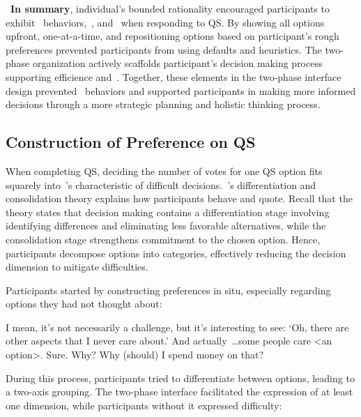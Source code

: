 ~\textbf{In summary}, individual's bounded rationality encouraged participants to exhibit~\underline{} behaviors,~\underline{}, and~\underline{} when responding to QS. By showing all options upfront, one-at-a-time, and repositioning options based on participant's rough preferences prevented participants from using defaults and heuristics. The two-phase organization actively scaffolds participant's decision making process supporting efficience\underline{} and~\underline{}. Together, these elements in the two-phase interface design prevented~\underline{} behaviors and supported participants in making more informed decisions through a more strategic planning and holistic thinking process.



\subsection{Construction of Preference on QS}

When completing QS, deciding the number of votes for one QS option fits squarely into~\textcite{lichtensteinConstructionPreference2006}'s characteristic of difficult decisions.~\textcite{svensonDifferentiationConsolidationTheory1992}'s differentiation and consolidation theory explains how participants behave and quote. Recall that the theory states that decision making contains a differentiation stage involving identifying differences and eliminating less favorable alternatives, while the consolidation stage strengthens commitment to the chosen option. Hence, participants decompose options into categories, effectively reducing the decision dimension to mitigate difficulties.

Participants started by constructing preferences in situ, especially regarding options they had not thought about:
\begin{displayquote}

    I mean, it's not necessarily a challenge, but it's interesting to see: `Oh, there are other aspects that I never care about.' And actually~\ldots some people care <an option>. Sure. Why? Why (should) I spend money on that? \\\hfill{}
\end{displayquote}

During this process, participants tried to differentiate between options, leading to a two-axis grouping. The two-phase interface facilitated the expression of at least one dimension, while participants without it expressed difficulty:

